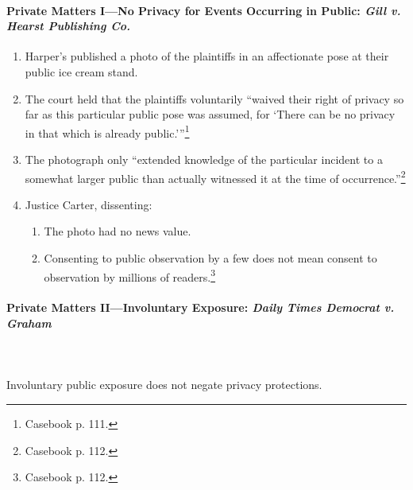\paragraph{Private Matters I---No Privacy for Events Occurring in Public: 
\emph{Gill v. Hearst Publishing Co.}}

\begin{enumerate}
    \item Harper's published a photo of the plaintiffs in an affectionate pose 
    at their public ice cream stand.
    \item The court held that the plaintiffs voluntarily \enquote{waived their right of 
    privacy so far as this particular public pose was assumed, for 
    \enquote{There can be no privacy in that which is already 
    public.}}\footnote{Casebook p. 111.}
    \item The photograph only ``extended knowledge of the particular incident to 
    a somewhat larger public than actually witnessed it at the time of 
    occurrence.''\footnote{Casebook p. 112.}
    \item Justice Carter, dissenting:
    \begin{enumerate}
        \item The photo had no news value.
        \item Consenting to public observation by a few does not mean consent to 
        observation by millions of readers.\footnote{Casebook p. 112.}
    \end{enumerate}
\end{enumerate}

\paragraph{Private Matters II---Involuntary Exposure: \emph{Daily Times Democrat 
v. Graham}}
~\\\\
Involuntary public exposure does not negate privacy protections. 

